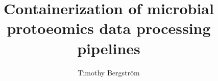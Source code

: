 \begin{titlepage}
\title{\vspace{60mm} \bf
        Containerization of microbial protoeomics data processing pipelines
}  %
\author{Timothy Bergström}
\maketitle
\thispagestyle{fancy}  %
\vspace*{\fill}
\end{titlepage}
